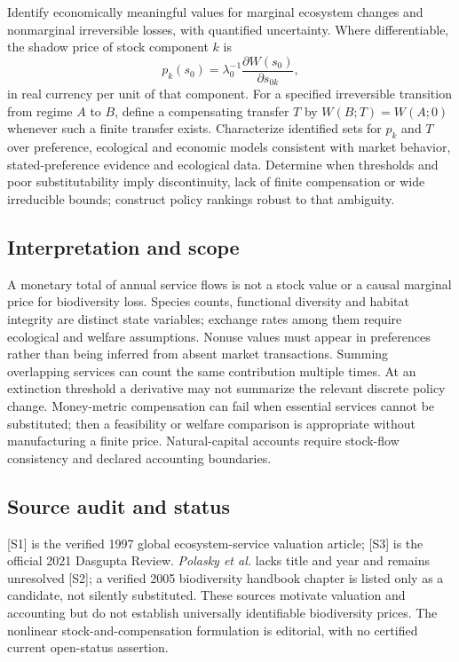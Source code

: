 \documentclass[11pt,a4paper]{article}
\begin{document}
Identify economically meaningful values for marginal ecosystem changes and nonmarginal irreversible losses, with quantified uncertainty. Where differentiable, the shadow price of stock component $k$ is
\[
p_k(s_0)=\lambda_0^{-1}\frac{\partial W(s_0)}{\partial s_{0k}},
\]
in real currency per unit of that component. For a specified irreversible transition from regime $A$ to $B$, define a compensating transfer $T$ by $W(B;T)=W(A;0)$ whenever such a finite transfer exists. Characterize identified sets for $p_k$ and $T$ over preference, ecological and economic models consistent with market behavior, stated-preference evidence and ecological data. Determine when thresholds and poor substitutability imply discontinuity, lack of finite compensation or wide irreducible bounds; construct policy rankings robust to that ambiguity.

\subsection*{Interpretation and scope}

A monetary total of annual service flows is not a stock value or a causal marginal price for biodiversity loss. Species counts, functional diversity and habitat integrity are distinct state variables; exchange rates among them require ecological and welfare assumptions. Nonuse values must appear in preferences rather than being inferred from absent market transactions. Summing overlapping services can count the same contribution multiple times. At an extinction threshold a derivative may not summarize the relevant discrete policy change. Money-metric compensation can fail when essential services cannot be substituted; then a feasibility or welfare comparison is appropriate without manufacturing a finite price. Natural-capital accounts require stock-flow consistency and declared accounting boundaries.

\subsection*{Source audit and status}

[S1] is the verified 1997 global ecosystem-service valuation article; [S3] is the official 2021 Dasgupta Review. \emph{Polasky et al.} lacks title and year and remains unresolved [S2]; a verified 2005 biodiversity handbook chapter is listed only as a candidate, not silently substituted. These sources motivate valuation and accounting but do not establish universally identifiable biodiversity prices. The nonlinear stock-and-compensation formulation is editorial, with no certified current open-status assertion.
\end{document}
